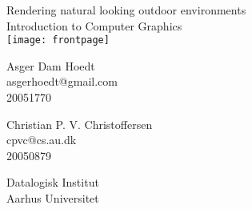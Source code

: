 \documentclass[a4paper,english]{report}
\begin{document}
\begin{titlepage}

\thispagestyle{empty}
\centering
{ \baselineskip=24pt
    {\LARGE Rendering natural looking outdoor environments}\\
    Introduction to Computer Graphics
    \vspace*{20pt}
    \\
    \texttt{[image: frontpage]}
    \vspace*{40pt}
    \\
    \begin{minipage}{0.4\textwidth}
      \centering
      Asger Dam Hoedt \\ asgerhoedt@gmail.com \\ 20051770
    \end{minipage}
    \begin{minipage}{0.4\textwidth}
      \centering
      Christian P. V. Christoffersen \\ cpvc@cs.au.dk \\ 20050879
    \end{minipage}
}
\vfill
\small
Datalogisk Institut\\
Aarhus Universitet
\end{titlepage}

\clearpage{}
\tableofcontents

\clearpage{}

















\appendix



\end{document}
